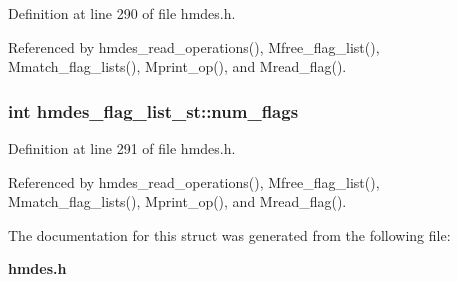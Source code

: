 Definition at line 290 of file hmdes.h.

Referenced by hmdes\_\-read\_\-operations(), Mfree\_\-flag\_\-list(), Mmatch\_\-flag\_\-lists(), Mprint\_\-op(), and Mread\_\-flag().
\subsubsection{\setlength{\rightskip}{0pt plus 5cm}int \bf{hmdes\_\-flag\_\-list\_\-st::num\_\-flags}}\label{structhmdes__flag__list__st_a5cc9249f4dac266f5545e2b15876d80}




Definition at line 291 of file hmdes.h.

Referenced by hmdes\_\-read\_\-operations(), Mfree\_\-flag\_\-list(), Mmatch\_\-flag\_\-lists(), Mprint\_\-op(), and Mread\_\-flag().

The documentation for this struct was generated from the following file:\begin{CompactItemize}
\item 
\bf{hmdes.h}\end{CompactItemize}

